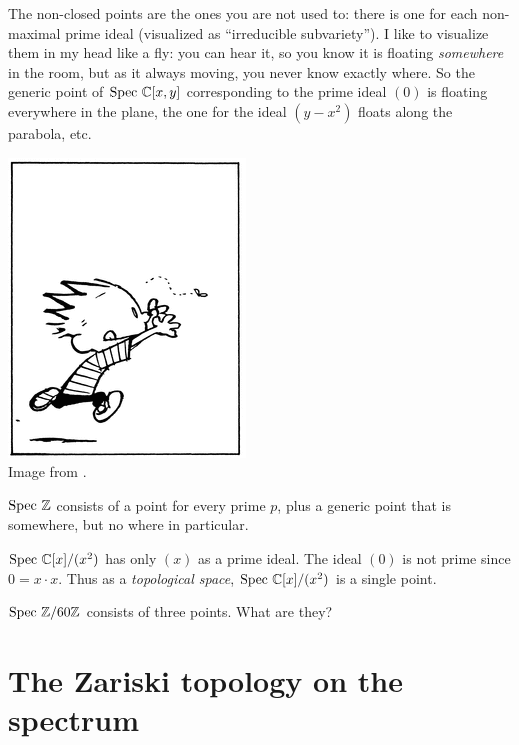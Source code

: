 The non-closed points are the ones you are not used to:
there is one for each non-maximal prime ideal
(visualized as ``irreducible subvariety'').
I like to visualize them in my head like a fly:
you can hear it, so you know it is floating \emph{somewhere} in the room,
but as it always moving, you never know exactly where.
So the generic point of $\text{Spec } \mathbb C[x,y]$ corresponding to the prime
ideal $(0)$ is floating everywhere in the plane,
the one for the ideal $(y-x^2)$ floats along the parabola, etc.
\begin{center}
	\includegraphics[scale=0.4]{media/calvin-hobbes-fly.png} \\
	\footnotesize Image from \cite{img:calvin_hobbes_fly}.
\end{center}

\begin{example}
	\listhack
	\begin{enumerate}[(a)]
		\ii $\text{Spec } \mathbb Z$ consists of a point for every prime $p$,
		plus a generic point that is somewhere, but no where in particular.

		\ii $\text{Spec } \mathbb C[x] / (x^2)$ has only $(x)$ as a prime ideal.
		The ideal $(0)$ is not prime since $0 = x \cdot x$.
		Thus as a \emph{topological space},
		$\text{Spec } \mathbb C[x] / (x^2)$ is a single point.
		
		\ii $\text{Spec } \mathbb Z/60\mathbb Z$ consists of three points.
		What are they?
	\end{enumerate}
\end{example}

\section{The Zariski topology on the spectrum}

